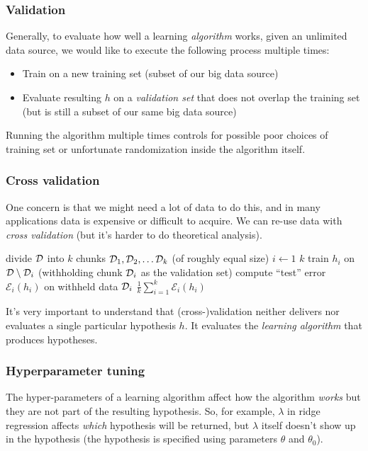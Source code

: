 \subsubsection{Validation}
Generally, to evaluate how well a learning {\em algorithm} works,
given an unlimited data source,
we would like to execute the following process multiple
times:
\begin{itemize}
  \item Train on a new training set (subset of our big data source)
  \item Evaluate resulting $h$ on a {\em validation set} that does not
        overlap the training set (but is still a subset of our same big
        data source)
\end{itemize}

Running the algorithm multiple times controls for possible poor choices of
training set or unfortunate randomization inside the algorithm itself.

\subsubsection{Cross validation}
\label{cross-validation}
One concern is that we might need a lot of data to do this, and in
many applications data is expensive or difficult to acquire. We can
re-use data with {\em{cross validation}} (but it's harder to do theoretical
analysis).  \\
\begin{codebox}
  \li divide ${\cal D}$ into $k$ chunks ${\cal D}_1, {\cal D}_2, \ldots {\cal D}_k$ (of roughly equal size)
  \li \For $i \gets 1$ \To $k$
  \li   \Do
  train $h_i$ on ${\cal D} \setminus {\cal D}_i$ (withholding chunk ${\cal D}_i$ as the validation set)
  \li     compute ``test'' error $\mathcal{E}_i (h_i)$ on withheld data ${\cal D}_i$
  \End
  \li \Return $\frac{1}{k} \sum_{i=1}^k \mathcal{E}_i (h_i)$
\end{codebox}

It's very important to understand that (cross-)validation neither
delivers nor evaluates a single particular hypothesis $h$.  It
evaluates the {\em learning algorithm} that produces hypotheses.

\subsubsection{Hyperparameter tuning}
The hyper-parameters of a learning algorithm affect how the algorithm
  {\em works} but they are not part of the resulting hypothesis.  So,
for example, $\lambda$ in ridge regression affects {\em which}
hypothesis will be returned, but $\lambda$ itself doesn't show up in
the hypothesis (the hypothesis is specified using parameters $\theta$ and
$\theta_0$).

